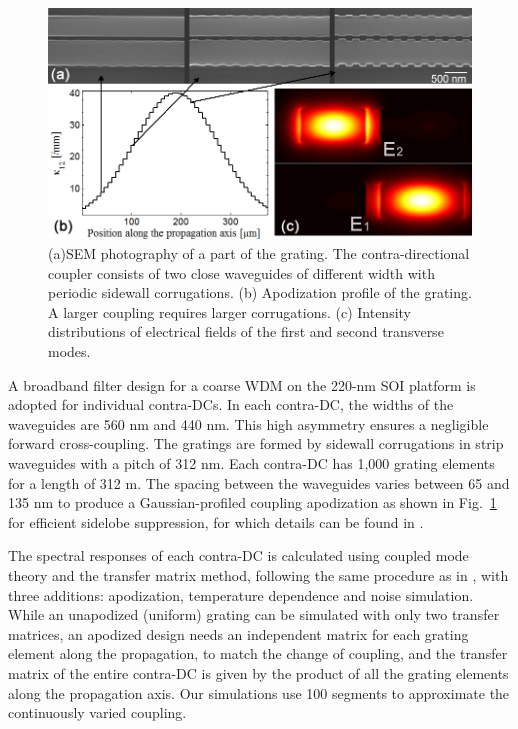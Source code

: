\documentclass[9pt,twocolumn,twoside]{osajnl}
\begin{document}
\begin{figure}[htbp]
\centering
\includegraphics[width=1\columnwidth]{data/FigApod}
\caption{(a)SEM photography of a part of the grating. The contra-directional coupler consists of two close waveguides of different width with periodic sidewall corrugations. (b) Apodization profile of the grating. A larger coupling requires larger corrugations. (c) Intensity distributions of electrical fields of the first and second transverse modes. }
\label{fig:SEM}
\end{figure} 


A broadband filter design for a coarse WDM on the 220-nm SOI platform \cite{shi2013siliconCWDM} is adopted for individual contra-DCs.  
In each contra-DC, the widths of the waveguides are 560 nm and 440 nm.
This high asymmetry ensures a negligible forward cross-coupling. 
The gratings are formed by sidewall corrugations in strip waveguides with a pitch of 312 nm.
Each contra-DC has 1,000 grating elements for a length of 312 \textmu m.
The spacing between the waveguides varies between 65 and 135 nm to produce a Gaussian-profiled coupling apodization as shown in Fig.~\ref{fig:SEM} for efficient sidelobe suppression, for which details can be found in \cite{shi2013siliconCWDM}.

The spectral responses of each contra-DC is calculated using coupled mode theory and the transfer matrix method, following the same procedure as in  \cite{shi2013siliconContraDC}, with three additions: apodization, temperature dependence and noise simulation.
While an unapodized (uniform) grating can be simulated with only two transfer matrices,
an apodized design needs an independent matrix for each grating element along the propagation, to match the change of coupling, and the transfer matrix of the entire contra-DC is given by the product of all the grating elements along the propagation axis.
Our simulations use 100 segments to approximate the continuously varied coupling.
\end{document}
